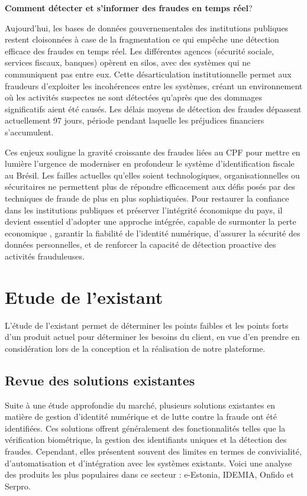 \textbf{Comment détecter et s'informer des fraudes en temps réel}?
\item Aujourd'hui, les bases de données gouvernementales des institutions publiques restent cloisonnées à case de la fragmentation ce qui empêche une détection efficace des fraudes en temps réel. Les différentes agences (sécurité sociale, services fiscaux, banques) opèrent en silos, avec des systèmes qui ne communiquent pas entre eux. Cette désarticulation institutionnelle permet aux fraudeurs d'exploiter les incohérences entre les systèmes, créant un environnement où les activités suspectes ne sont détectées qu'après que des dommages significatifs aient été causés. Les délais moyens de détection des fraudes dépassent actuellement 97 jours, période pendant laquelle les préjudices financiers s'accumulent.

Ces enjeux souligne la gravité croissante des fraudes liées au CPF pour mettre en lumière l'urgence de moderniser en profondeur le système d'identification fiscale au Brésil. Les failles actuelles qu'elles soient technologiques, organisationnelles ou sécuritaires ne permettent plus de répondre efficacement aux défis posés par des techniques de fraude de plus en plus sophistiquées. Pour restaurer la confiance dans les institutions publiques et préserver l'intégrité économique du pays, il devient essentiel d'adopter une approche intégrée, capable de surmonter la perte economique , garantir la fiabilité de l'identité numérique, d'assurer la sécurité des données personnelles, et de renforcer la capacité de détection proactive des activités frauduleuses.


\section{Etude de l'existant}
L'étude de l'existant permet de déterminer les points faibles et les points forts d'un produit actuel pour déterminer les besoins du client, en vue d'en prendre en considération lors de la conception et la réalisation de notre plateforme.
\subsection{Revue des solutions existantes}
Suite à une étude approfondie du marché, plusieurs solutions existantes en matière de gestion d'identité numérique et de lutte contre la fraude ont été identifiées. Ces solutions offrent généralement des fonctionnalités telles que la vérification biométrique, la gestion des identifiants uniques et la détection des fraudes. Cependant, elles présentent souvent des limites en termes de convivialité, d'automatisation et d'intégration avec les systèmes existants. Voici une analyse des produits les plus populaires dans ce secteur :  e-Estonia, IDEMIA, Onfido et Serpro.

